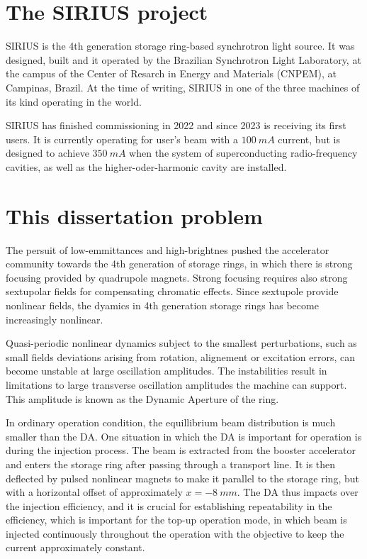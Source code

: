 \section{The SIRIUS project}
SIRIUS is the 4th generation storage ring-based synchrotron light source. It was designed, built and it operated by the Brazilian Synchrotron Light Laboratory, at the campus of the Center of Resarch in Energy and Materials (CNPEM), at Campinas, Brazil. At the time of writing, SIRIUS in one of the three machines of its kind operating in the world.

SIRIUS has finished commissioning in 2022 and since 2023 is receiving its first users. It is currently operating for user's beam with a $100~\unit{mA}$ current, but is designed to achieve $350~\unit{mA}$ when the system of superconducting radio-frequency cavities, as well as the higher-oder-harmonic cavity are installed.

\section{This dissertation problem}
    The persuit of low-emmittances and high-brightnes pushed the accelerator community towards the 4th generation of storage rings, in which there is strong focusing provided by quadrupole magnets. Strong focusing requires also strong sextupolar fields for compensating chromatic effects. Since sextupole provide nonlinear fields, the dyamics in 4th generation storage rings has become increasingly nonlinear.

    Quasi-periodic nonlinear dynamics subject to the smallest perturbations, such as small fields deviations arising from rotation, alignement or excitation errors, can become unstable at large oscillation amplitudes. The instabilities result in limitations to large transverse oscillation amplitudes the machine can support. This amplitude is known as the Dynamic Aperture of the ring.

    In ordinary operation condition, the equillibrium beam distribution is much smaller than the DA. One situation in which the DA is important for operation is during the injection process. The beam is extracted from the booster accelerator and enters the storage ring after passing through a transport line. It is then deflected by pulsed nonlinear magnets to make it parallel to the storage ring, but with a horizontal offset of approximately $x=-8~\unit{mm}$. The DA thus impacts over the injection efficiency, and it is crucial for establishing repeatability in the efficiency, which is important for the top-up operation mode, in which beam is injected continuously throughout the operation with the objective to keep the current approximately constant.

